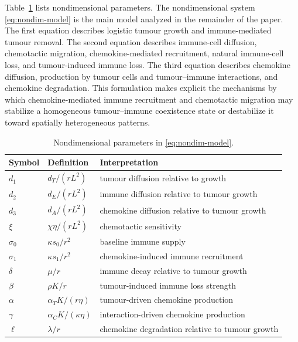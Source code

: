 \documentclass[a4paper,fleqn,longmktitle]{cas-sc}
\theoremstyle{plain}
\theoremstyle{definition}
\numberwithin{equation}{section}
\begin{document}
Table~\ref{tab:nondimensional-parameters} lists nondimensional parameters. The nondimensional system \eqref{eq:nondim-model} is the main model analyzed in
the remainder of the paper. The first equation describes logistic tumour growth
and immune-mediated tumour removal. The second equation describes immune-cell
diffusion, chemotactic migration, chemokine-mediated recruitment, natural
immune-cell loss, and tumour-induced immune loss. The third equation describes
chemokine diffusion, production by tumour cells and tumour--immune interactions,
and chemokine degradation. This formulation makes explicit the mechanisms by
which chemokine-mediated immune recruitment and chemotactic migration may
stabilize a homogeneous tumour--immune coexistence state or destabilize it
toward spatially heterogeneous patterns.

\begin{table}[htbp]
\centering
\caption{Nondimensional parameters in \eqref{eq:nondim-model}.}
\label{tab:nondimensional-parameters}
\begin{tabularx}{\textwidth}{lll}
\toprule
Symbol & Definition & Interpretation \\
\midrule
$d_1$ & $d_T/(rL^2)$ & tumour diffusion relative to growth \\
$d_2$ & $d_E/(rL^2)$ & immune diffusion relative to tumour growth \\
$d_3$ & $d_A/(rL^2)$ & chemokine diffusion relative to tumour growth \\
$\xi$ & $\chi\eta/(rL^2)$ & chemotactic sensitivity \\
$\sigma_0$ & $\kappa s_0/r^2$ & baseline immune supply \\
$\sigma_1$ & $\kappa s_1/r^2$ & chemokine-induced immune recruitment \\
$\delta$ & $\mu/r$ & immune decay relative to tumour growth \\
$\beta$ & $\rho K/r$ & tumour-induced immune loss strength \\
$\alpha$ & $\alpha_TK/(r\eta)$ & tumour-driven chemokine production \\
$\gamma$ & $\alpha_CK/(\kappa\eta)$ & interaction-driven chemokine production \\
$\ell$ & $\lambda/r$ & chemokine degradation relative to tumour growth \\
\bottomrule
\end{tabularx}
\end{table}
\end{document}
